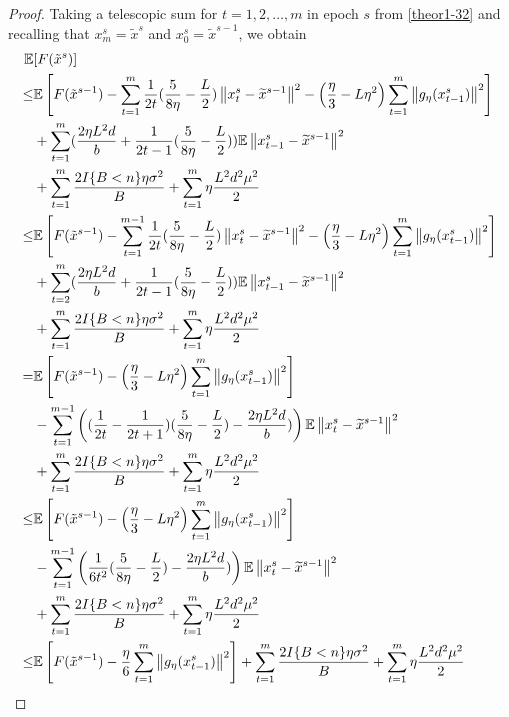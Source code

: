\documentclass{article}
\newcommand*{\E}{\mathbb{E}}
\newcommand{\norm}[1]{\left\lVert#1\right\rVert}
\theoremstyle{definition}
\theoremstyle{remark}
\begin{document}
\begin{proof}
Taking a telescopic sum for $t = 1, 2, \ldots, m$ in epoch $s$ from \eqref{theor1-32} and recalling that $x_m^s = \tilde{x}^s$ and $x_0^s = \tilde{x}^{s-1}$, we obtain
 \begin{align} 
\E&[F(\tilde{x}^s)] \notag
\\ \leq& \E\left[F(\tilde{x}^{s-1})  -\sum_{t=1}^m\frac{1}{2t}(\frac{5}{8\eta} - \frac{L}{2})\norm{{x}_t^s-\widetilde{x}^{s-1}}^2- \left(\frac{\eta}{3}-L\eta^2\right)\sum_{t=1}^m\norm{g_{\eta}(x_{t-1}^s)}^2\right]\notag\\
&+\sum_{t=1}^m(\frac{2\eta L^2 d}{b}+\frac{1}{2t-1}(\frac{5}{8\eta} - \frac{L}{2}))\E\norm{x_{t-1}^s-\widetilde{x}^{s-1}}^2\notag\\
&+ \sum_{t=1}^m \frac{2I\{B < n\}\eta \sigma ^2}{B}+\sum_{t=1}^m \eta \frac{L^2 d^2 \mu^2}{2}\notag\\
\leq& \E\left[F(\tilde{x}^{s-1})  -\sum_{t=1}^{m-1}\frac{1}{2t}(\frac{5}{8\eta} - \frac{L}{2})\norm{{x}_t^s-\widetilde{x}^{s-1}}^2- \left(\frac{\eta}{3}-L\eta^2\right)\sum_{t=1}^m\norm{g_{\eta}(x_{t-1}^s)}^2\right]\notag\\
&+\sum_{t=2}^m(\frac{2\eta L^2 d}{b}+\frac{1}{2t-1}(\frac{5}{8\eta} - \frac{L}{2}))\E\norm{x_{t-1}^s-\widetilde{x}^{s-1}}^2\notag\\
&+ \sum_{t=1}^m \frac{2I\{B < n\}\eta \sigma ^2}{B}+\sum_{t=1}^m \eta \frac{L^2 d^2 \mu^2}{2}\label{theor1-34}
\\
=& \E\left[F(\tilde{x}^{s-1}) - \left(\frac{\eta}{3}-L\eta^2\right)\sum_{t=1}^m\norm{g_{\eta}(x_{t-1}^s)}^2\right]\notag\\
&-\sum_{t=1}^{m-1}\left((\frac{1}{2t} - \frac{1}{2t+1})(\frac{5}{8\eta} - \frac{L}{2})-\frac{2\eta L^2 d}{b})\right)\E\norm{x_{t}^s-\widetilde{x}^{s-1}}^2\notag\\
&+ \sum_{t=1}^m \frac{2I\{B < n\}\eta \sigma ^2}{B}+\sum_{t=1}^m \eta \frac{L^2 d^2 \mu^2}{2}\notag\\
\leq& \E\left[F(\tilde{x}^{s-1}) - \left(\frac{\eta}{3}-L\eta^2\right)\sum_{t=1}^m\norm{g_{\eta}(x_{t-1}^s)}^2\right]\notag\\
&-\sum_{t=1}^{m-1}\left(\frac{1}{6t^2}(\frac{5}{8\eta} - \frac{L}{2})-\frac{2\eta L^2 d}{b})\right)\E\norm{x_{t}^s-\widetilde{x}^{s-1}}^2\notag\\
&+ \sum_{t=1}^m \frac{2I\{B < n\}\eta \sigma ^2}{B}+\sum_{t=1}^m \eta \frac{L^2 d^2 \mu^2}{2}\notag\\
\leq& \E\left[F(\tilde{x}^{s-1}) - \frac{\eta}{6}\sum_{t=1}^m\norm{g_{\eta}(x_{t-1}^s)}^2\right]+ \sum_{t=1}^m \frac{2I\{B < n\}\eta \sigma ^2}{B}+\sum_{t=1}^m \eta \frac{L^2 d^2 \mu^2}{2}\label{theor1-35}

\end{align}
\end{proof}
\end{document}
